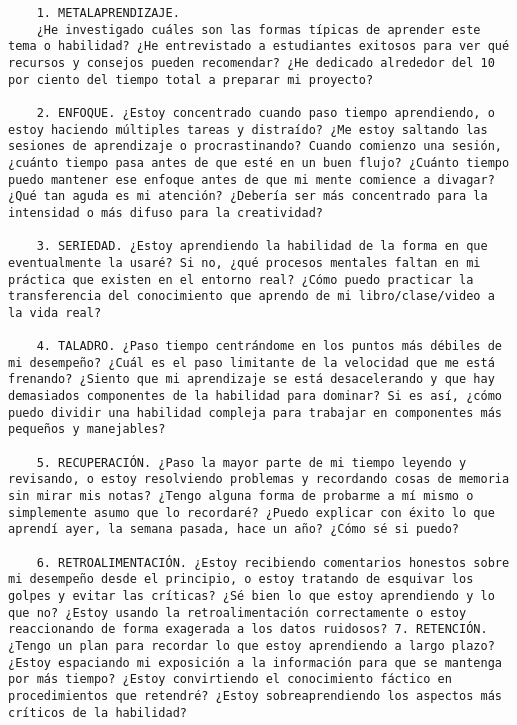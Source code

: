 \begin{verbatim}
	1. METALAPRENDIZAJE.
	¿He investigado cuáles son las formas típicas de aprender este tema o habilidad? ¿He entrevistado a estudiantes exitosos para ver qué recursos y consejos pueden recomendar? ¿He dedicado alrededor del 10 por ciento del tiempo total a preparar mi proyecto?
	
	2. ENFOQUE. ¿Estoy concentrado cuando paso tiempo aprendiendo, o estoy haciendo múltiples tareas y distraído? ¿Me estoy saltando las sesiones de aprendizaje o procrastinando? Cuando comienzo una sesión, ¿cuánto tiempo pasa antes de que esté en un buen flujo? ¿Cuánto tiempo puedo mantener ese enfoque antes de que mi mente comience a divagar? ¿Qué tan aguda es mi atención? ¿Debería ser más concentrado para la intensidad o más difuso para la creatividad?
	
	3. SERIEDAD. ¿Estoy aprendiendo la habilidad de la forma en que eventualmente la usaré? Si no, ¿qué procesos mentales faltan en mi práctica que existen en el entorno real? ¿Cómo puedo practicar la transferencia del conocimiento que aprendo de mi libro/clase/video a la vida real?
	
	4. TALADRO. ¿Paso tiempo centrándome en los puntos más débiles de mi desempeño? ¿Cuál es el paso limitante de la velocidad que me está frenando? ¿Siento que mi aprendizaje se está desacelerando y que hay demasiados componentes de la habilidad para dominar? Si es así, ¿cómo puedo dividir una habilidad compleja para trabajar en componentes más pequeños y manejables?
	
	5. RECUPERACIÓN. ¿Paso la mayor parte de mi tiempo leyendo y revisando, o estoy resolviendo problemas y recordando cosas de memoria sin mirar mis notas? ¿Tengo alguna forma de probarme a mí mismo o simplemente asumo que lo recordaré? ¿Puedo explicar con éxito lo que aprendí ayer, la semana pasada, hace un año? ¿Cómo sé si puedo?
	
	6. RETROALIMENTACIÓN. ¿Estoy recibiendo comentarios honestos sobre mi desempeño desde el principio, o estoy tratando de esquivar los golpes y evitar las críticas? ¿Sé bien lo que estoy aprendiendo y lo que no? ¿Estoy usando la retroalimentación correctamente o estoy reaccionando de forma exagerada a los datos ruidosos? 7. RETENCIÓN. ¿Tengo un plan para recordar lo que estoy aprendiendo a largo plazo? ¿Estoy espaciando mi exposición a la información para que se mantenga por más tiempo? ¿Estoy convirtiendo el conocimiento fáctico en procedimientos que retendré? ¿Estoy sobreaprendiendo los aspectos más críticos de la habilidad?
	

\end{verbatim}
